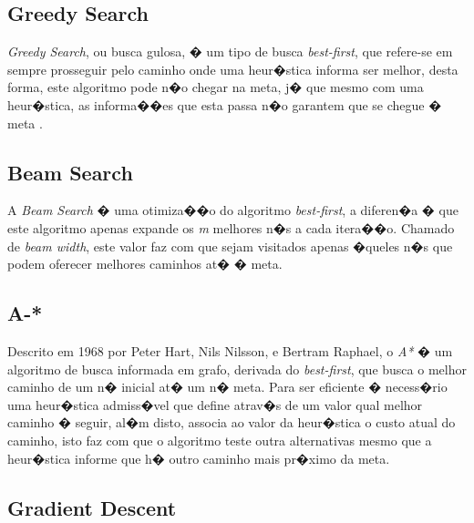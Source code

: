 \documentclass[12pt]{article}
\begin{document}

\subsection{Greedy Search}

\textit{Greedy Search}, ou busca gulosa, � um tipo de busca \textit{best-first}, que refere-se em sempre prosseguir pelo caminho onde uma heur�stica informa ser melhor, desta forma, este algoritmo pode n�o chegar na meta, j� que mesmo com uma heur�stica, as informa��es que esta passa n�o garantem que se chegue � meta \cite{norvig95}. 

\subsection{Beam Search}

A \textit{Beam Search} � uma otimiza��o do algoritmo \textit{best-first}, a diferen�a � que este algoritmo apenas expande os \textit{m} melhores n�s a cada itera��o. Chamado de \textit{beam width}, este valor faz com que sejam visitados apenas �queles n�s que podem oferecer melhores caminhos at� � meta.

\subsection{A-*}

Descrito em 1968 por Peter Hart, Nils Nilsson, e Bertram Raphael\cite{hart1968}, o \textit{A*} � um algoritmo de busca informada em grafo, derivada do \textit{best-first}, que busca o melhor caminho de um n� inicial at� um n� meta. Para ser eficiente � necess�rio uma heur�stica admiss�vel que define atrav�s de um valor qual melhor caminho � seguir, al�m disto, associa ao valor da heur�stica o custo atual do caminho, isto faz com que o algoritmo teste outra alternativas mesmo que a heur�stica informe que h� outro caminho mais pr�ximo da meta.

\subsection{Gradient Descent}
\end{document}
